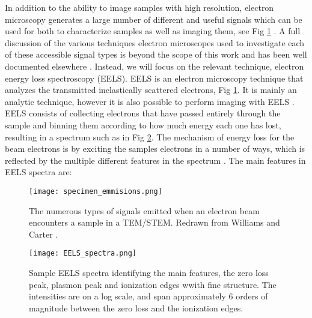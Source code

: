 In addition to the ability to image samples with high resolution, electron microscopy generates a large number of different and useful signals which can be used for both to characterize samples as well as imaging them, see Fig \ref{specimen_emmisions} \cite{williams_transmission_2008}.  A full discussion of the various techniques electron microscopes used to investigate each of these accessible signal types is beyond the scope of this work and has been well documented elsewhere \cite{goldstein_electron_2003,Egerton,williams_transmission_2008,reimer_electron_1998}.  Instead, we will focus on the relevant technique, electron energy loss spectroscopy (EELS).  EELS is an electron microscopy technique that analyzes the transmitted inelastically scattered electrons, Fig \ref{specimen_emmisions}\cite{Egerton}.  It is mainly an analytic technique, however it is also possible to perform imaging with EELS \cite{varela_stem-eels_2012}.  EELS consists of collecting electrons that have passed entirely through the sample and binning them according to how much energy each one has lost, resulting in a spectrum such as in Fig \ref{EELS_spectra}.  The mechanism of energy loss for the beam electrons is by exciting the samples electrons in a number of ways, which is reflected by the multiple different features in the spectrum \cite{Egerton}. The main features in EELS spectra are: 
\begin{figure}
	\centering
	\texttt{[image: specimen\_emmisions.png]}
	\caption{The numerous types of signals emitted when an electron beam encounters a sample in a TEM/STEM.   Redrawn from Williams and Carter \cite{williams_transmission_2008}.  }
	\label{specimen_emmisions}
\end{figure}

\begin{figure}
	\centering
	\texttt{[image: EELS\_spectra.png]}
	\caption{Sample EELS spectra identifying the main features, the zero loss peak, plasmon peak and ionization edges wwith fine structure.   The intensities are on a log scale, and span approximately 6 orders of magnitude between the zero loss and the ionization edges.  }
	\label{EELS_spectra}
\end{figure}

